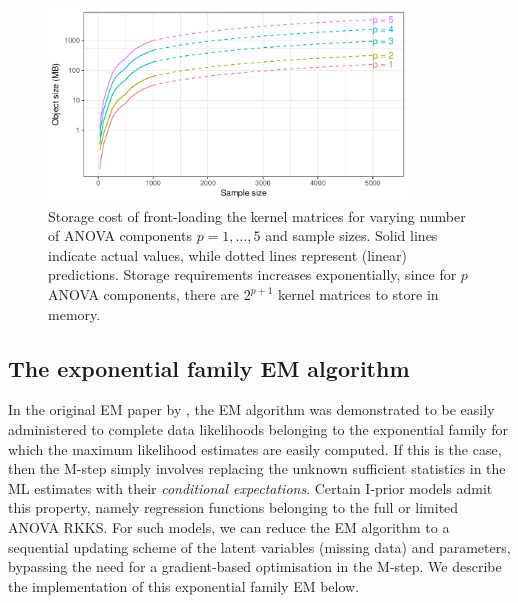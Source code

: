 \begin{figure}[hbt]
  \centering
  \includegraphics[width=0.85\textwidth]{figure/04-iprior_size}
  \caption[Storage cost of front-loading the kernel matrices.]{Storage cost of front-loading the kernel matrices for varying number of ANOVA components $p=1,\dots,5$ and sample sizes. Solid lines indicate actual values, while dotted lines represent (linear) predictions. Storage requirements increases exponentially, since for $p$ ANOVA components, there are $2^{p+1}$ kernel matrices to store in memory.}
  \label{fig:ipriorstorage}
\end{figure}

\subsection{The exponential family EM algorithm}
\label{sec:expfamEM}

In the original EM paper by \citet{dempster1977maximum}, the EM algorithm was demonstrated to be easily administered to complete data likelihoods belonging to the exponential family for which the maximum likelihood estimates are easily computed.
If this is the case, then the M-step simply involves replacing the unknown sufficient statistics in the ML estimates with their \emph{conditional expectations}.
Certain I-prior models admit this property, namely regression functions belonging to the full or limited ANOVA RKKS.
For such models, we can reduce the EM algorithm to a sequential updating scheme of the latent variables (missing data) and parameters, bypassing the need for a gradient-based optimisation in the M-step.
We describe the implementation of this exponential family EM below.

